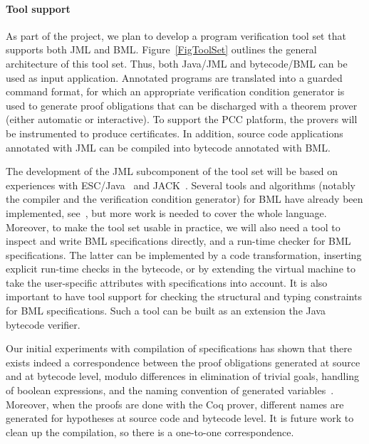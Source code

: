 \paragraph{Tool support}
As part of the \mobius project, we plan to develop a program
verification tool set that supports both JML and
BML. Figure~\ref{FigToolSet} outlines the general architecture of this
tool set. Thus, both Java/JML and bytecode/BML can be used as input
application. Annotated programs are translated into a guarded
command format, for which an appropriate verification condition
generator is used to generate proof obligations that can be discharged
with a theorem prover (either automatic or interactive). To support
the PCC platform, the provers will be instrumented to produce
certificates. In addition, source code applications annotated with JML
can be compiled into bytecode annotated with BML.

The development of the JML subcomponent of the tool set will be based
on experiences with ESC/Java~\cite{CokK04} and JACK~\cite{BurdyRL03}.
Several tools and algorithms (notably the compiler and the
verification condition generator) for BML have already been
implemented, see~\cite{BP06JSV,Pavlova:phd}, but more work is needed
to cover the whole language. Moreover, to make the tool set usable in
practice, we will also need a tool to inspect and write BML
specifications directly, and a run-time checker for BML
specifications. The latter can be implemented by a code
transformation, inserting explicit run-time checks in the bytecode, or
by extending the virtual machine to take the user-specific attributes
with specifications into account.  It is also important to have tool
support for checking the structural and typing constraints for BML
specifications. Such a tool can be built as an extension the Java
bytecode verifier.

Our initial experiments with compilation of specifications has shown
that there exists indeed a correspondence between the proof
obligations generated at source and at bytecode level, modulo
differences in elimination of trivial goals, handling of boolean
expressions, and the naming convention of generated
variables~\cite{Pavlova:phd}. Moreover, when the proofs are done with
the Coq prover, different names are generated for hypotheses at source
code and bytecode level. It is future work to clean up the
compilation, so there is a one-to-one correspondence.




 

